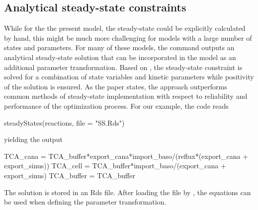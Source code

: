 \documentclass[article]{jss}
\begin{document}

\subsection{Analytical steady-state constraints}
While for the the present model, the steady-state could be explicitly calculated by hand, this might be much more challenging for models with a large number of states and parameters. For many of these models, the  command outputs an analytical steady-state solution that can be incorporated in the model as an additional parameter transformation. Based on \cite{rosenblatt2016customized}, the steady-state constraint is solved for a combination of state variables and kinetic parameters while positivity of the solution is ensured. As the paper states, the approach outperforms common methods of steady-state implementation with respect to reliability and performance of the optimization process. For our example, the code reads
\begin{CodeChunk}
\begin{CodeInput}
steadyStates(reactions, file = "SS.Rds")
\end{CodeInput}
\end{CodeChunk}
yielding the output

\begin{CodeChunk}
\begin{CodeInput}
TCA_cana   = TCA_buffer*export_cana*import_baso/(reflux*(export_cana + 
	     export_sinus))
TCA_cell   = TCA_buffer*import_baso/(export_cana + export_sinus)
TCA_buffer = TCA_buffer
\end{CodeInput}
\end{CodeChunk}

The solution is stored in an Rds file. After loading the file by , the equations can be used when defining the parameter transformation.



{}
\end{document}
